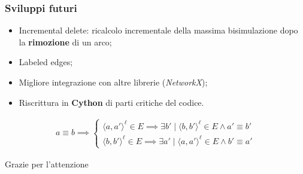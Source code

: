 \documentclass{beamer}
\begin{document}
\begin{frame}
    \frametitle{Sviluppi futuri}
    \begin{itemize}
        \item Incremental delete: ricalcolo incrementale della massima bisimulazione dopo la \textbf{rimozione} di un arco;
        \item Labeled edges;
        \item Migliore integrazione con altre librerie (\emph{NetworkX});
        \item Riscrittura in \textbf{Cython} di parti critiche del codice.
    \end{itemize}

    \begin{gather*}
        a \equiv b \implies
        \begin{cases}
            \langle a, a' \rangle^\ell \in E \implies \exists b' \mid \langle b, b' \rangle^\ell \in E \land a' \equiv b'\\
            \langle b, b' \rangle^\ell \in E \implies \exists a' \mid \langle a, a' \rangle^\ell \in E \land b' \equiv a'
        \end{cases}
    \end{gather*}
\end{frame}

\begin{frame}
    Grazie per l'attenzione
\end{frame}
\end{document}
